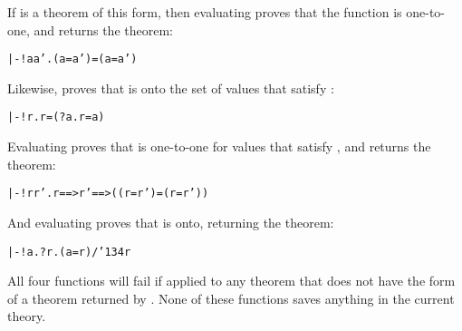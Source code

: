 \noindent If  is a theorem of this form, then evaluating
 proves that the function  is
one-to-one, and returns the theorem:

\begin{hol}\begin{alltt}
   |- !a a'. ( a =  a') = (a = a')
\end{alltt}\end{hol}

\noindent Likewise,  proves that  is
onto the set of values that satisfy :

{\def\bk{\char'134}
\begin{hol}\begin{alltt}
   |- !r.  r = (?a. r =  a)
\end{alltt}\end{hol}}

\noindent Evaluating  proves that 
is one-to-one for values that satisfy , and returns the theorem:

{\def\bk{\char'134}
\begin{hol}\begin{alltt}
   |- !r r'.  r ==>  r' ==> (( r =  r') = (r = r'))
\end{alltt}\end{hol}}

\noindent And evaluating  proves that 
is onto, returning the theorem:

{\def\bk{\char'134}
\begin{hol}\begin{alltt}
   |- !a. ?r. (a =  r) /\bk {} r
\end{alltt}\end{hol}}

\noindent All four functions will fail if applied to any theorem that does not
have the form of a theorem returned by .
None of these functions saves anything in the current theory.



